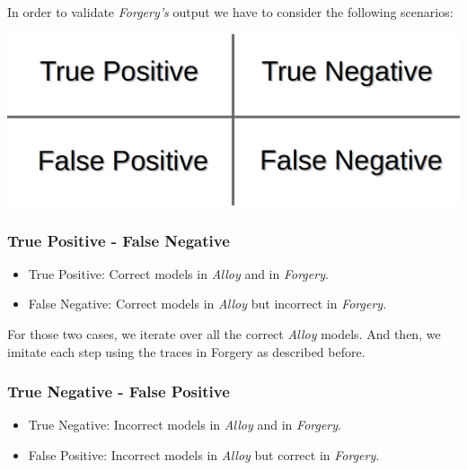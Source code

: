 \documentclass[oneside]{book}
\begin{document}
In order to validate \textit{Forgery's} output we have to consider the following scenarios:
\begin{center}
\includegraphics[scale=0.25]{scenarios}
\end{center}

\subsubsection{True Positive - False Negative}
\begin{itemize}
  \item True Positive: Correct models in \textit{Alloy} and in \textit{Forgery}.
  \item False Negative: Correct models in \textit{Alloy} but incorrect in \textit{Forgery}.
\end{itemize}

For those two cases, we iterate over all the correct \textit{Alloy} models. And then, we imitate each step using the traces in Forgery as described before.

\subsubsection{True Negative - False Positive}
\begin{itemize}
  \item True Negative: Incorrect models in \textit{Alloy} and in \textit{Forgery}.
  \item False Positive: Incorrect models in \textit{Alloy} but correct in \textit{Forgery}.
\end{itemize}
\end{document}
